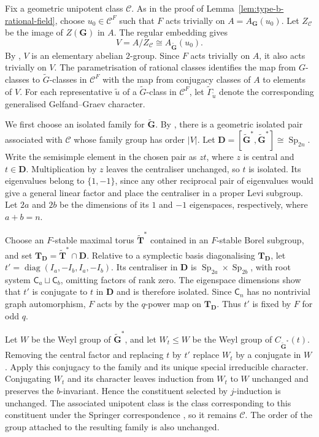 \documentclass[10pt]{amsart}
\theoremstyle{definition}
\renewcommand{\leq}{\leqslant}
\let\oldendproof\endproof
\renewenvironment{proof}[1][\proofname]{%
  \oldproof[\bfseries #1]%
}{\oldendproof}
\numberwithin{equation}{section}
\numberwithin{table}{section}
\begin{document}
\begin{proof}
Fix a geometric unipotent class $\mathcal C$. As in the proof of
Lemma~\ref{lem:type-b-rational-field}, choose $u_0\in\mathcal C^F$ such
that $F$ acts trivially on $A=A_{\mathbf G}(u_0)$.
Let $Z_{\mathcal C}$ be the image of $Z(\mathbf G)$ in $A$. The regular
embedding gives
\[
 V=A/Z_{\mathcal C}\cong A_{\widetilde{\mathbf G}}(u_0).
\]
By \cite[Section~2]{Taylor2013}, $V$ is an elementary abelian $2$-group.
Since $F$ acts trivially on $A$, it also acts trivially on $V$.
The parametrisation of rational classes identifies the map from
$G$-classes to $\widetilde G$-classes in $\mathcal C^F$ with the map
from conjugacy classes of $A$ to elements of $V$.
For each representative $\widetilde u$ of a $\widetilde G$-class in
$\mathcal C^F$, let $\widetilde\Gamma_{\widetilde u}$ denote the
corresponding generalised Gelfand--Graev character.

We first choose an isolated family for
$\widetilde{\mathbf G}$. By
\cite[Proposition~2.4]{GeckHezard2008}, there is a geometric isolated
pair associated with $\mathcal C$ whose family group has order $|V|$.
Let $\mathbf D=[\widetilde{\mathbf G}^*,\widetilde{\mathbf G}^*]
\cong\operatorname{Sp}_{2n}$. Write the semisimple element in the
chosen pair as $zt$, where $z$ is central and $t\in\mathbf D$.
Multiplication by $z$ leaves the centraliser unchanged, so $t$
is isolated. Its eigenvalues belong to $\{1,-1\}$, since any
other reciprocal pair of eigenvalues would give a general linear
factor and place the centraliser in a proper Levi subgroup.
Let $2a$ and $2b$ be the dimensions of its $1$ and $-1$
eigenspaces, respectively, where $a+b=n$.

Choose an $F$-stable maximal torus $\widetilde{\mathbf T}^*$
contained in an $F$-stable Borel subgroup, and set
$\mathbf T_{\mathbf D}=\widetilde{\mathbf T}^*\cap\mathbf D$.
Relative to a symplectic basis diagonalising
$\mathbf T_{\mathbf D}$, let
$t'=\operatorname{diag}(I_a,-I_b,I_a,-I_b)$.
Its centraliser in $\mathbf D$ is
$\operatorname{Sp}_{2a}\times\operatorname{Sp}_{2b}$, with root
system $\mathsf C_a\sqcup\mathsf C_b$, omitting factors of rank zero.
The eigenspace dimensions show that $t'$ is conjugate to $t$
in $\mathbf D$ and is therefore isolated.
Since $\mathsf C_n$ has no nontrivial graph automorphism, $F$
acts by the $q$-power map on $\mathbf T_{\mathbf D}$.
Thus $t'$ is fixed by $F$ for odd $q$.

Let $W$ be the Weyl group of $\widetilde{\mathbf G}^*$, and let $W_t\leq W$
be the Weyl group of $C_{\widetilde{\mathbf G}^*}(t)$.
Removing the central factor and replacing $t$ by $t'$ replace $W_t$
by a conjugate in $W$. Apply this conjugacy to the family and its
unique special irreducible character. Conjugating $W_t$ and its
character leaves induction from $W_t$ to $W$ unchanged and preserves
the $b$-invariant. Hence the constituent selected by $j$-induction
is unchanged. The associated unipotent class is the class corresponding
to this constituent under the Springer correspondence
\cite[p.~821]{GeckHezard2008}, so it remains $\mathcal C$.
The order of the group attached to the resulting family is also unchanged.


\end{proof}
\end{document}

